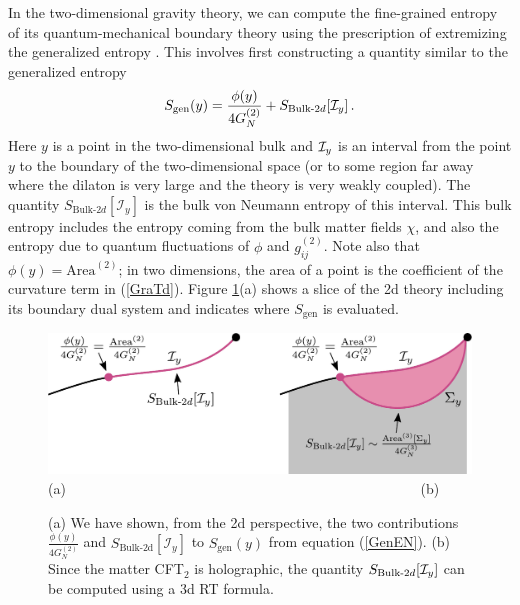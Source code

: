 \documentclass[12pt]{article}
\def\la{\label}
\def\nref#1{(\ref{#1})}
\begin{document}
In the two-dimensional gravity theory, we can compute the fine-grained entropy  of its quantum-mechanical boundary theory using the prescription of extremizing the generalized entropy \cite{Engelhardt:2014gca}. 
This involves first constructing a quantity similar to the generalized entropy 
\begin{align} \la{GenEN}
S_\mathrm{gen}(y) =  \frac{\phi(y)}{4G_{N}^{(2)}} + S_{\mathrm{Bulk}\text{-}2d}  [{\cal I}_y] \, .
\end{align} 
Here $y$ is a point in the two-dimensional bulk and ${\cal I}_y$ is an interval from the point $y$ to the boundary of the two-dimensional space (or to  some region far away where the dilaton is very large and the theory is very weakly coupled). 
The quantity $S_{\mathrm{Bulk}\text{-}2d}[\mathcal{I}_y]$
is the bulk von Neumann entropy of this interval. 
This bulk entropy includes the entropy coming from the bulk matter fields $\chi$, and also the entropy due to quantum fluctuations of $\phi$ and $g_{ij}^{(2)}$.
Note also that $\phi(y) = \text{Area}^{(2)}$; in two dimensions, the area of a point is the coefficient of the curvature term in \nref{GraTd}.
Figure \ref{3dsgen}(a) shows a slice of the 2d theory including its boundary dual system and indicates where $S_{\text{gen}}$ is evaluated.
\begin{figure}[t]
    \begin{center}
    \includegraphics[scale=.6]{Figures/3dsgen}
 \\ (a) ~~~~~~~~~~~~~~~~~~~~~~~~~~~~~~~~~~~~~~~~~~~~~~~~~~(b) 
    \end{center}
    \caption{(a) We have shown, from the 2d perspective, the two contributions $\frac{\phi(y)}{4G_N^{(2)}}$ and $S_\text{Bulk-2d}[\mathcal{I}_y]$ to $S_\text{gen}(y)$ from equation (\ref{GenEN}). (b)  Since the matter CFT$_2$ is holographic, the quantity $S_{\mathrm{Bulk}\text{-}2d}  [{\cal I}_y]$ can be computed using a 3d RT formula.}
    \label{3dsgen}
\end{figure}
\end{document}

